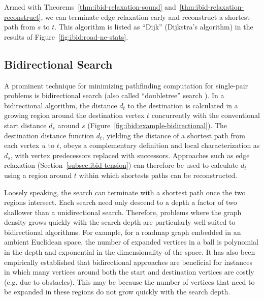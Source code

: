 Armed with Theorems~\ref{thm:ibid-relaxation-sound}
and~\ref{thm:ibid-relaxation-reconstruct},
we can terminate edge relaxation early
and reconstruct a shortest path from $s$ to $t$.
This algorithm is listed as ``Dijk''
(Dijkstra's algorithm)
in the results of Figure~\ref{fig:ibid:road-ne-stats}.

\subsection{Bidirectional Search}
\label{sec:ibid:bidirectional}

A prominent technique for minimizing pathfinding computation for
single-pair problems
is bidirectional search
(also called ``doubletree'' search \citep{doran1966doubletree}).
In a bidirectional algorithm,
the distance $d_t$ to the destination is calculated in a growing region
around the destination vertex $t$
concurrently with the conventional start distance $d_s$ around $s$
(Figure~\ref{fig:ibid:example-bidirectional}).
The destination distance function $d_t$,
yielding the distance of a shortest path from each vertex $u$ to $t$,
obeys a complementary definition and local characterization as $d_s$,
with vertex predecessors replaced with successors.
Approaches such as edge relaxation (Section~\ref{subsec:ibid-tension})
can therefore be used to calculate $d_t$ using a region around $t$
within which shortests paths can be reconstructed.

Loosely speaking,
the search can terminate with a shortest path
once the two regions intersect.
Each search need only descend to a depth a factor of two
shallower than a unidirectional search.
Therefore, problems where the graph density grows quickly with
the search depth are particularly well-suited to bidirectional
algorithms.
For example,
for a roadmap graph embedded in an ambient Euclidean space,
the number of expanded vertices in a ball is polynomial in the depth
and exponential in the dimensionality of the space.
It has also been empirically established that bidirectional approaches
are beneficial for instances in which many vertices around
both the start and destination vertices are costly
(e.g. due to obstacles).
This may be because the number of vertices that need to be expanded
in these regions do not grow quickly with the search depth.

